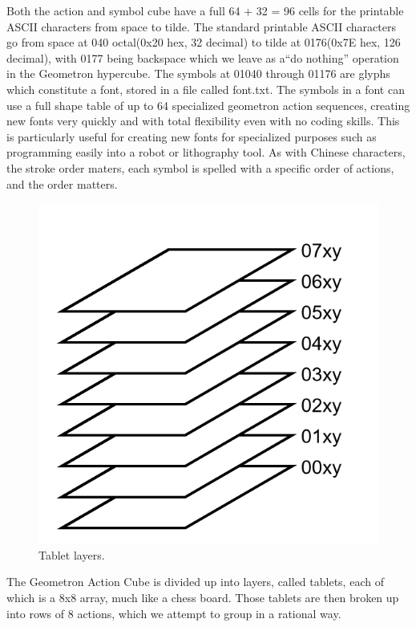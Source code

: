 \documentclass[11pt]{article}
\begin{document}
    Both the action and symbol cube have a full 64 + 32 = 96 cells for the printable ASCII characters from space to tilde.  The standard printable ASCII characters go from space at 040 octal(0x20 hex, 32 decimal) to tilde at 0176(0x7E hex, 126 decimal), with 0177 being backspace which we leave as a``do nothing'' operation in the Geometron hypercube. The symbols at 01040 through 01176 are glyphs which constitute a font, stored in a file called font.txt.  The symbols in a font can use a full shape table of up to 64 specialized geometron action sequences, creating new fonts very quickly and with total flexibility even with no coding skills.  This is particularly useful for creating new fonts for specialized purposes such as programming easily into a robot or lithography tool. As with Chinese characters, the stroke order maters, each symbol is spelled with a specific order of actions, and the order matters.   


\begin{figure}
\includegraphics[width=\linewidth]{figures/fig2cubestack.png}
\caption{Tablet layers.}
\end{figure}

    The Geometron Action Cube is divided up into layers, called tablets, each of which is a 8x8 array, much like a chess board.  Those tablets are then broken up into rows of 8 actions, which we attempt to group in a rational way.   
\end{document}
